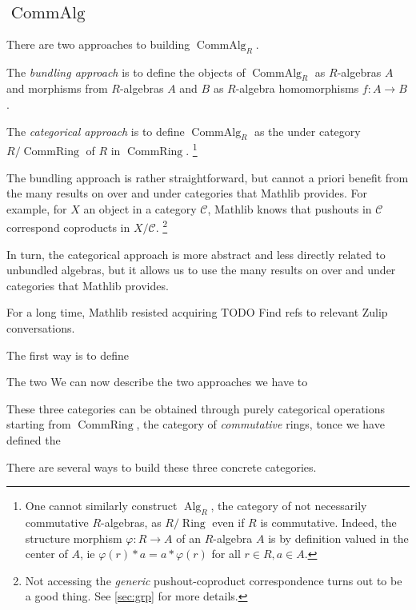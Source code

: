 \documentclass{article}
\newcommand{\mcC}{\mathcal C}
\DeclareMathOperator{\Ring}{Ring}
\DeclareMathOperator{\Alg}{Alg}
\DeclareMathOperator{\CommRing}{CommRing}
\DeclareMathOperator{\CommAlg}{CommAlg}
\begin{document}
\subsection{\texorpdfstring{$\CommAlg$}{CommAlg}}\label{sec:comm-alg}


There are two approaches to building $\CommAlg_R$.

The \emph{bundling approach} is to define the objects of $\CommAlg_R$ as $R$-algebras $A$ and morphisms from $R$-algebras $A$ and $B$ as $R$-algebra homomorphisms $f : A \to B$.

\begin{leancode}

\end{leancode}

The \emph{categorical approach} is to define $\CommAlg_R$ as the under category $R / \CommRing$ of $R$ in $\CommRing$.
\footnote{One cannot similarly construct $\Alg_R$, the category of not necessarily commutative $R$-algebras, as $R / \Ring$ even if $R$ is commutative.
Indeed, the structure morphism $\varphi : R \to A$ of an $R$-algebra $A$ is by definition valued in the center of $A$, ie $\varphi(r) * a = a * \varphi(r)$ for all $r \in R, a \in A$.}

The bundling approach is rather straightforward, but cannot a priori benefit from the many results on over and under categories that Mathlib provides.
For example, for $X$ an object in a category $\mcC$, Mathlib knows that pushouts in $\mcC$ correspond coproducts in $X/𝒞$.
\footnote{Not accessing the \emph{generic} pushout-coproduct correspondence turns out to be a good thing.
See \cref{sec:grp} for more details.}

In turn, the categorical approach is more abstract and less directly related to unbundled algebras, but it allows us to use the many results on over and under categories that Mathlib provides.

For a long time, Mathlib resisted acquiring TODO Find refs to relevant Zulip conversations.

The first way is to define



The two  We can now describe the two approaches we have to



These three categories can be obtained through purely categorical operations starting from $\CommRing$, the category of \emph{commutative} rings, tonce we have defined the

There are several ways to build these three concrete categories.
\end{document}
